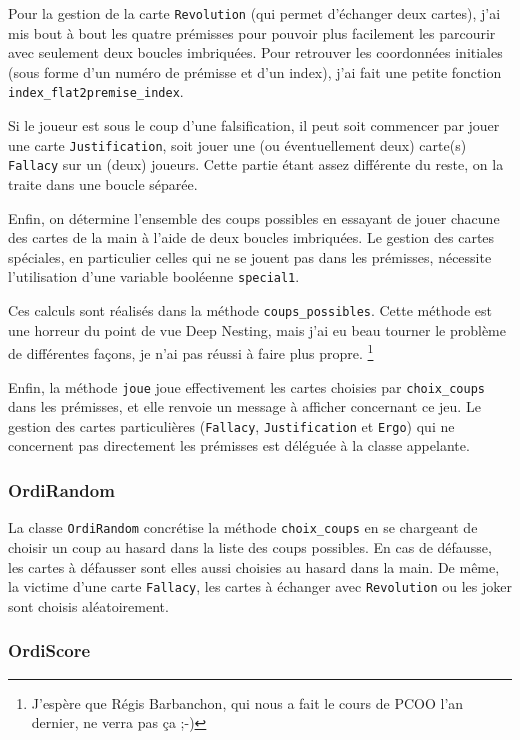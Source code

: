 \documentclass[12pt, algo]{cours}
\begin{document}
Pour la gestion de la carte \texttt{Revolution} (qui permet d'échanger deux cartes), j'ai mis bout à bout les quatre prémisses pour pouvoir plus facilement les parcourir avec seulement deux boucles imbriquées. Pour retrouver les coordonnées initiales (sous forme d'un numéro de prémisse et d'un index), j'ai fait une petite fonction \texttt{index\_flat2premise\_index}.

Si le joueur est sous le coup d'une falsification, il peut soit commencer par jouer une carte \texttt{Justification}, soit jouer une (ou éventuellement deux) carte(s) \texttt{Fallacy} sur un (deux) joueurs. Cette partie étant assez différente du reste, on la traite dans une boucle séparée.

Enfin, on détermine l'ensemble des coups possibles en essayant de jouer chacune des cartes de la main à l'aide de deux boucles imbriquées. Le gestion des cartes spéciales, en particulier celles qui ne se jouent pas dans les prémisses, nécessite l'utilisation d'une variable booléenne \texttt{special1}.

Ces calculs sont réalisés dans la méthode \texttt{coups\_possibles}. Cette méthode est une horreur du point de vue Deep Nesting, mais j'ai eu beau tourner le problème de différentes façons, je n'ai pas réussi à faire plus propre. \footnote{J'espère que Régis Barbanchon, qui nous a fait le cours de PCOO l'an dernier, ne verra pas ça ;-)}

Enfin, la méthode \texttt{joue} joue effectivement les cartes choisies par \texttt{choix\_coups} dans les prémisses, et elle renvoie un message à afficher concernant ce jeu. Le gestion des cartes particulières (\texttt{Fallacy}, \texttt{Justification} et \texttt{Ergo}) qui ne concernent pas directement les prémisses est déléguée à la classe appelante.

\subsubsection{OrdiRandom}

La classe \texttt{OrdiRandom} concrétise la méthode \texttt{choix\_coups} en se chargeant de choisir un coup au hasard dans la liste des coups possibles. En cas de défausse, les cartes à défausser sont elles aussi choisies au hasard dans la main. De même, la \og victime \fg d'une carte \texttt{Fallacy}, les cartes à échanger avec \texttt{Revolution} ou les joker sont choisis aléatoirement.

\subsubsection{OrdiScore}
\end{document}
